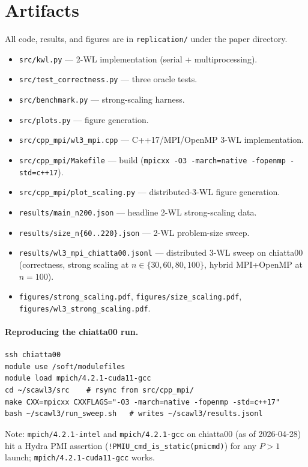 \documentclass[11pt]{article}
\begin{document}
\section*{Artifacts}
All code, results, and figures are in \texttt{replication/} under the paper directory.
\begin{itemize}[leftmargin=1.5em,itemsep=0pt]
  \item \texttt{src/kwl.py} --- 2-WL implementation (serial + multiprocessing).
  \item \texttt{src/test\_correctness.py} --- three oracle tests.
  \item \texttt{src/benchmark.py} --- strong-scaling harness.
  \item \texttt{src/plots.py} --- figure generation.
  \item \texttt{src/cpp\_mpi/wl3\_mpi.cpp} --- C++17/MPI/OpenMP 3-WL implementation.
  \item \texttt{src/cpp\_mpi/Makefile} --- build (\texttt{mpicxx -O3 -march=native -fopenmp -std=c++17}).
  \item \texttt{src/cpp\_mpi/plot\_scaling.py} --- distributed-3-WL figure generation.
  \item \texttt{results/main\_n200.json} --- headline 2-WL strong-scaling data.
  \item \texttt{results/size\_n\{60..220\}.json} --- 2-WL problem-size sweep.
  \item \texttt{results/wl3\_mpi\_chiatta00.jsonl} --- distributed 3-WL sweep on chiatta00 (correctness, strong scaling at $n\in\{30,60,80,100\}$, hybrid MPI{+}OpenMP at $n{=}100$).
  \item \texttt{figures/strong\_scaling.pdf}, \texttt{figures/size\_scaling.pdf}, \texttt{figures/wl3\_strong\_scaling.pdf}.
\end{itemize}

\paragraph{Reproducing the chiatta00 run.}
\begin{verbatim}
ssh chiatta00
module use /soft/modulefiles
module load mpich/4.2.1-cuda11-gcc
cd ~/scawl3/src    # rsync from src/cpp_mpi/
make CXX=mpicxx CXXFLAGS="-O3 -march=native -fopenmp -std=c++17"
bash ~/scawl3/run_sweep.sh   # writes ~/scawl3/results.jsonl
\end{verbatim}
Note: \texttt{mpich/4.2.1-intel} and \texttt{mpich/4.2.1-gcc} on chiatta00 (as of 2026-04-28) hit a Hydra PMI assertion (\texttt{!PMIU\_cmd\_is\_static(pmicmd)}) for any $P{>}1$ launch; \texttt{mpich/4.2.1-cuda11-gcc} works.
\end{document}

